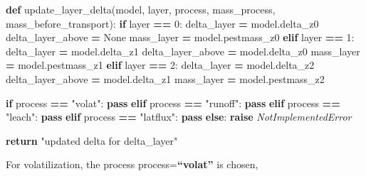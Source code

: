 \documentclass[]{article}
\newenvironment{Shaded}{\begin{snugshade}}{\end{snugshade}}
\newcommand{\KeywordTok}[1]{\textcolor[rgb]{0.13,0.29,0.53}{\textbf{#1}}}
\newcommand{\DecValTok}[1]{\textcolor[rgb]{0.00,0.00,0.81}{#1}}
\newcommand{\StringTok}[1]{\textcolor[rgb]{0.31,0.60,0.02}{#1}}
\newcommand{\VariableTok}[1]{\textcolor[rgb]{0.00,0.00,0.00}{#1}}
\newcommand{\ControlFlowTok}[1]{\textcolor[rgb]{0.13,0.29,0.53}{\textbf{#1}}}
\newcommand{\OperatorTok}[1]{\textcolor[rgb]{0.81,0.36,0.00}{\textbf{#1}}}
\newcommand{\PreprocessorTok}[1]{\textcolor[rgb]{0.56,0.35,0.01}{\textit{#1}}}
\newcommand{\NormalTok}[1]{#1}
\begin{document}
\begin{Shaded}
\begin{Highlighting}[]
\KeywordTok{def}\NormalTok{ update_layer_delta(model, layer, process, mass_process, mass_before_transport):}
    \ControlFlowTok{if}\NormalTok{ layer }\OperatorTok{==} \DecValTok{0}\NormalTok{:}
\NormalTok{      delta_layer }\OperatorTok{=}\NormalTok{ model.delta_z0}
\NormalTok{      delta_layer_above }\OperatorTok{=} \VariableTok{None}
\NormalTok{      mass_layer }\OperatorTok{=}\NormalTok{ model.pestmass_z0}
    \ControlFlowTok{elif}\NormalTok{ layer }\OperatorTok{==} \DecValTok{1}\NormalTok{:}
\NormalTok{        delta_layer }\OperatorTok{=}\NormalTok{ model.delta_z1}
\NormalTok{        delta_layer_above }\OperatorTok{=}\NormalTok{ model.delta_z0}
\NormalTok{        mass_layer }\OperatorTok{=}\NormalTok{ model.pestmass_z1}
    \ControlFlowTok{elif}\NormalTok{ layer }\OperatorTok{==} \DecValTok{2}\NormalTok{:}
\NormalTok{        delta_layer }\OperatorTok{=}\NormalTok{ model.delta_z2}
\NormalTok{        delta_layer_above }\OperatorTok{=}\NormalTok{ model.delta_z1}
\NormalTok{        mass_layer }\OperatorTok{=}\NormalTok{ model.pestmass_z2}
        
    \ControlFlowTok{if}\NormalTok{ process }\OperatorTok{==} \StringTok{"volat"}\NormalTok{:}
        \ControlFlowTok{pass}
    \ControlFlowTok{elif}\NormalTok{ process }\OperatorTok{==} \StringTok{"runoff"}\NormalTok{:}
        \ControlFlowTok{pass}
    \ControlFlowTok{elif}\NormalTok{ process }\OperatorTok{==} \StringTok{"leach"}\NormalTok{:}
        \ControlFlowTok{pass}
    \ControlFlowTok{elif}\NormalTok{ process }\OperatorTok{==} \StringTok{"latflux"}\NormalTok{:}
        \ControlFlowTok{pass}
    \ControlFlowTok{else}\NormalTok{:}
        \ControlFlowTok{raise} \PreprocessorTok{NotImplementedError}
    
    \ControlFlowTok{return} \StringTok{"updated delta for delta_layer"}
                       
\end{Highlighting}
\end{Shaded}

For volatilization, the process process=\textbf{``volat''} is chosen,
\end{document}
